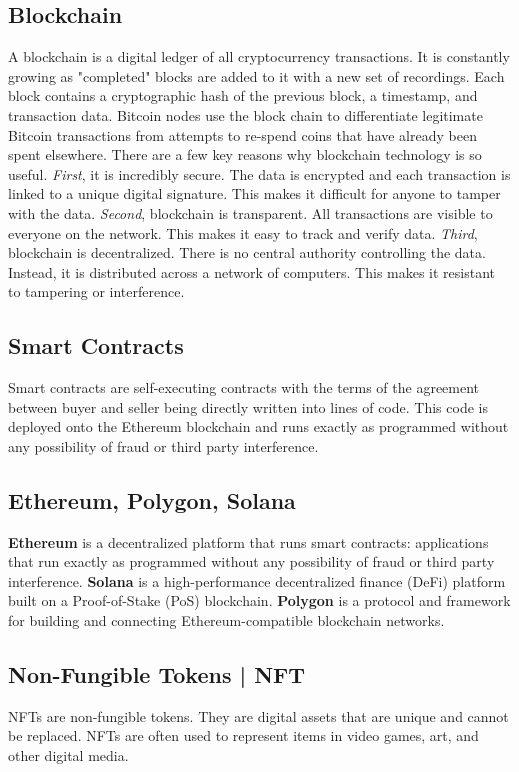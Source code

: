 \subsection{Blockchain}
A blockchain is a digital ledger of all cryptocurrency transactions. It is constantly growing as "completed" blocks are added to it with a new set of recordings. Each block contains a cryptographic hash of the previous block, a timestamp, and transaction data. Bitcoin nodes use the block chain to differentiate legitimate Bitcoin transactions from attempts to re-spend coins that have already been spent elsewhere.
There are a few key reasons why blockchain technology is so useful.
\textit{First}, it is incredibly secure. The data is encrypted and each transaction is linked to a unique digital signature. This makes it difficult for anyone to tamper with the data. \textit{Second}, blockchain is transparent. All transactions are visible to everyone on the network. This makes it easy to track and verify data. \textit{Third}, blockchain is decentralized. There is no central authority controlling the data. Instead, it is distributed across a network of computers. This makes it resistant to tampering or interference.

\subsection{Smart Contracts}
Smart contracts are self-executing contracts with the terms of the agreement between buyer and seller being directly written into lines of code. This code is deployed onto the Ethereum blockchain and runs exactly as programmed without any possibility of fraud or third party interference.

\subsection{Ethereum, Polygon, Solana}
\textbf{Ethereum} is a decentralized platform that runs smart contracts: applications that run exactly as programmed without any possibility of fraud or third party interference.
\textbf{Solana} is a high-performance decentralized finance (DeFi) platform built on a Proof-of-Stake (PoS) blockchain. \textbf{Polygon} is a protocol and framework for building and connecting Ethereum-compatible blockchain networks.

\subsection{Non-Fungible Tokens | NFT}
NFTs are non-fungible tokens. They are digital assets that are unique and cannot be replaced. NFTs are often used to represent items in video games, art, and other digital media.

